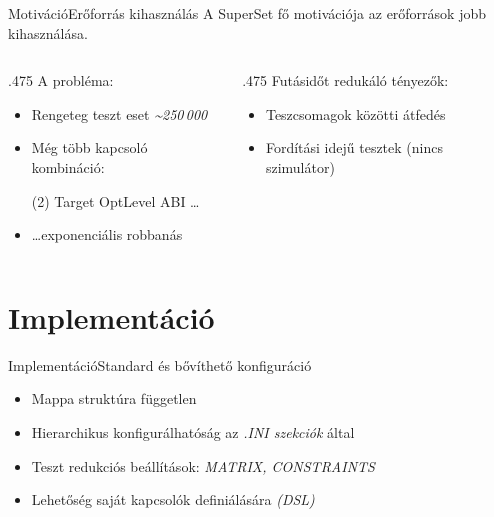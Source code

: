 \documentclass[aspectratio=169,9pt]{beamer}
\begin{document}
    \begin{frame}{Motiváció}{Erőforrás kihasználás}
        A \alert{SuperSet} fő motivációja az erőforrások jobb kihasználása.

        \vspace{12pt}
        \begin{columns}[T]
            \begin{column}{.475\textwidth}
                A probléma:

                \begin{itemize}
                    \item Rengeteg teszt eset \textit{\~{}250\,000}
                    \item Még több kapcsoló kombináció:
                          \begin{tasks} (2)
                              \task{} Target
                              \task{} OptLevel
                              \task{} ABI
                              \task{} \dots
                          \end{tasks}
                    \item \dots exponenciális robbanás
                \end{itemize}
            \end{column}

            \begin{column}{.475\textwidth}
                Futásidőt redukáló tényezők:
                \begin{itemize}
                    \item Teszcsomagok közötti átfedés
                    \item Fordítási idejű tesztek (nincs szimulátor)
                \end{itemize}
            \end{column}
        \end{columns}
    \end{frame}

\section{Implementáció}

    \begin{frame}{Implementáció}{Standard és bővíthető konfiguráció}
        \begin{itemize}
            \item Mappa struktúra független
            \item Hierarchikus konfigurálhatóság az \textit{.INI szekciók} által
            \item Teszt redukciós beállítások: \textit{MATRIX, CONSTRAINTS}
            \item Lehetőség saját kapcsolók definiálására \textit{(DSL)}
        \end{itemize}
    \end{frame}
\end{document}
